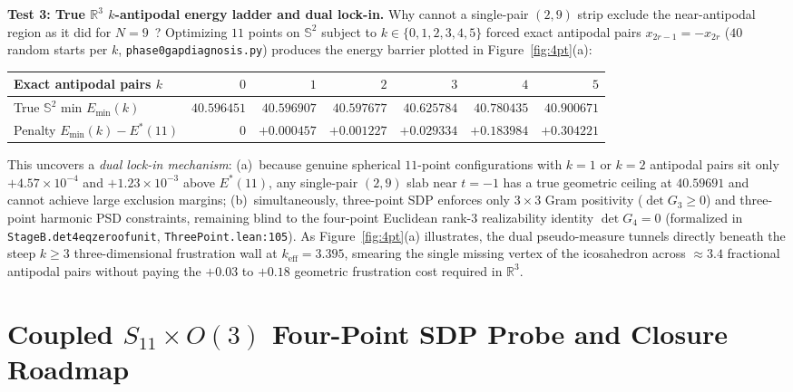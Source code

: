 \documentclass[11pt,reqno]{amsart}
\renewcommand{\_}{\origunderscore\allowbreak}
\renewcommand{\paragraph}[1]{\medskip\noindent\textbf{#1}\enspace}
\theoremstyle{definition}
\newcommand{\R}{\mathbb{R}}
\newcommand{\Sph}{\mathbb{S}^2}
\begin{document}
\paragraph{Test 3: True $\R^3$ $k$-antipodal energy ladder and dual lock-in.}
Why cannot a single-pair $(2,9)$ strip exclude the near-antipodal region as it did for $N = 9$~\cite{Li2026N9}?
Optimizing $11$ points on $\Sph$ subject to $k \in \{0,1,2,3,4,5\}$ forced exact antipodal pairs $x_{2r-1} = -x_{2r}$ ($40$ random starts per $k$, \texttt{phase0\_gap\_diagnosis.py}) produces the energy barrier plotted in Figure~\ref{fig:4pt}(a):
\begin{center}
\footnotesize
\begin{tabular}{@{}lrrrrrr@{}}
  \toprule
  Exact antipodal pairs $k$ & $0$ & $1$ & $2$ & $3$ & $4$ & $5$ \\
  \midrule
  True $\Sph$ min $E_{\min}(k)$ & $40.596451$ & $40.596907$ & $40.597677$ & $40.625784$ & $40.780435$ & $40.900671$ \\
  Penalty $E_{\min}(k) - E^*(11)$ & $0$ & $+0.000457$ & $+0.001227$ & $+0.029334$ & $+0.183984$ & $+0.304221$ \\
  \bottomrule
\end{tabular}
\end{center}
This uncovers a \emph{dual lock-in mechanism}:
(a)~because genuine spherical $11$-point configurations with $k = 1$ or $k = 2$ antipodal pairs sit only $+4.57 \times 10^{-4}$ and $+1.23 \times 10^{-3}$ above $E^*(11)$, any single-pair $(2,9)$ slab near $t = -1$ has a true geometric ceiling at $40.59691$ and cannot achieve large exclusion margins;
(b)~simultaneously, three-point SDP enforces only $3\times 3$ Gram positivity ($\det G_3 \ge 0$) and three-point harmonic PSD constraints, remaining blind to the four-point Euclidean rank-$3$ realizability identity $\det G_4 = 0$ (formalized in \texttt{StageB.det4\_eq\_zero\_of\_unit}, \texttt{ThreePoint.lean:105}).
As Figure~\ref{fig:4pt}(a) illustrates, the dual pseudo-measure tunnels directly beneath the steep $k \ge 3$ three-dimensional frustration wall at $k_{\mathrm{eff}} = 3.395$, smearing the single missing vertex of the icosahedron across $\approx 3.4$ fractional antipodal pairs without paying the $+0.03$ to $+0.18$ geometric frustration cost required in $\R^3$.

\section{Coupled \texorpdfstring{$S_{11} \times O(3)$}{S11 x O(3)} Four-Point SDP Probe and Closure Roadmap}\label{sec:fourpoint}
\end{document}
